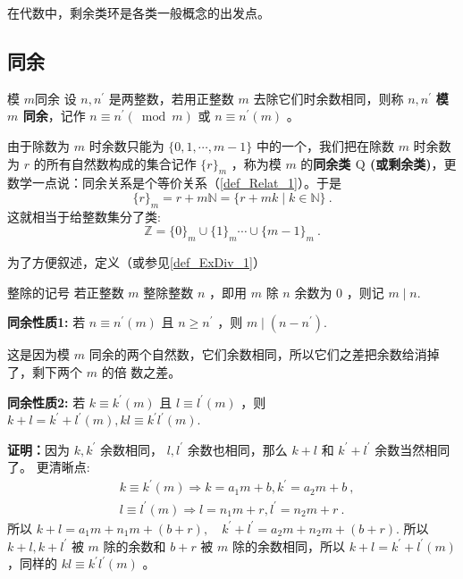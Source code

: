 
在代数中，剩余类环是各类一般概念的出发点。
\subsection{同余}
\begin{definition}{模 $m$同余}\label{def_RRing_1}
设 $n, n^{\prime}$ 是两整数，若用正整数 $m$ 去除它们时余数相同，则称 $n, n^{\prime}$ \textbf{模 $m$ 同余}，记作 $n \equiv n^{\prime}(\bmod m)$ 或 $n \equiv n^{\prime}(m)$ 。 
\end{definition} 
由于除数为 $m$ 时余数只能为 $\{0,1, \cdots, m-1\}$ 中的一个，我们把在除数 $m$ 时余数为 $r$ 的所有自然数构成的集合记作 $\{r\}_m$ ，称为模 $m$ 的\textbf{同余类 $\mathrm{Q}$ (或剩余类)}，更数学一点说：同余关系是个等价关系（\autoref{def_Relat_1}）。于是
\begin{equation}
\{r\}_m=r+m \mathbb{N}=\{r+m k \mid k \in \mathbb{N}\}~.
\end{equation}
这就相当于给整数集分了类:
\begin{equation}
\mathbb{Z}=\{0\}_m \cup\{1\}_m \cdots \cup\{m-1\}_m~.
\end{equation}

为了方便叙述，定义（或参见\autoref{def_ExDiv_1}）
\begin{definition}{整除的记号}
若正整数 $m$ 整除整数 $n$ ，即用 $m$ 除 $n$ 余数为 0 ，则记 $m \mid n$.
\end{definition}
\textbf{同余性质1:} 若 $n \equiv n^{\prime}(m)$ 且 $n \geq n^{\prime}$ ，则 $m \mid\left(n-n^{\prime}\right)$.

这是因为模 $m$ 同余的两个自然数，它们余数相同，所以它们之差把余数给消掉了，剩下两个 $m$ 的倍 数之差。

\textbf{同余性质2:} 若 $k \equiv k^{\prime}(m)$ 且 $l \equiv l^{\prime}(m)$ ，则 $k+l=k^{\prime}+l^{\prime}(m), k l \equiv k^{\prime} l^{\prime}(m)$.

\textbf{证明：}因为 $k, k^{\prime}$ 余数相同， $l, l^{\prime}$ 余数也相同，那么 $k+l$ 和 $k^{\prime}+l^{\prime}$ 余数当然相同了。
更清晰点:
\begin{equation}
\begin{aligned}
& k \equiv k^{\prime}(m) \Rightarrow k=a_1 m+b, k^{\prime}=a_2 m+b~, \\
& l \equiv l^{\prime}(m) \Rightarrow l=n_1 m+r, l^{\prime}=n_2 m+r~.
\end{aligned}
\end{equation}
所以 $k+l=a_1 m+n_1 m+(b+r), \quad k^{\prime}+l^{\prime}=a_2 m+n_2 m+(b+r).$
所以 $k+l, k+l^{\prime}$ 被 $m$ 除的余数和 $b+r$ 被 $m$ 除的余数相同，所以 $k+l=k^{\prime}+l^{\prime}(m)$
，同样的 $k l \equiv k^{\prime} l^{\prime}(m)$ 。


